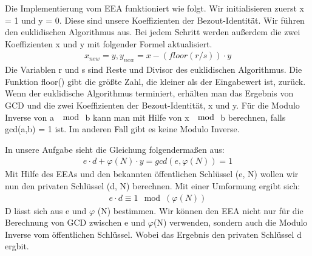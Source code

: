 \documentclass[course=asp]{aspdoc}
\begin{document}
Die Implementierung vom EEA funktioniert wie folgt. Wir initialisieren zuerst x = 1 und y = 0. Diese sind unsere Koeffizienten der Bezout-Identität. Wir führen den euklidischen Algorithmus aus. Bei jedem Schritt werden außerdem die zwei Koeffizienten x und y mit folgender Formel aktualisiert. 
\begin{align}
	x_{new} = y, y_{new} = x - (floor(r/s)) \cdot y
\end{align} 
Die Variablen r und s sind Reste und Divisor des euklidischen Algorithmus. Die Funktion floor() gibt die größte Zahl, die kleiner als der Eingabewert ist, zurück. 
Wenn der euklidische Algorithmus terminiert, erhälten man das Ergebnis von GCD und die zwei Koeffizienten der Bezout-Identität, x und y.\cite{ExtendedEuclideanAlgorithm} Für die Modulo Inverse von a $\mod$ b kann man mit Hilfe von x $\mod$ b berechnen, falls gcd(a,b) = 1 ist. Im anderen Fall gibt es keine Modulo Inverse.
 
In unsere Aufgabe sieht die Gleichung folgendermaßen aus:
\begin{align}
	e\cdot d + \varphi (N)\cdot y = gcd(e, \varphi(N)) = 1
\end{align}
Mit Hilfe des EEAs und den bekannten öffentlichen Schlüssel (e, N) wollen wir nun den privaten Schlüssel (d, N) berechnen. Mit einer Umformung ergibt sich: 
\begin{align}	
	e\cdot d \equiv 1 \mod (\varphi(N))
\end{align}
D lässt sich aus e und $\varphi $ (N) bestimmen. Wir können den EEA nicht nur für die Berechnung von GCD zwischen e und $\varphi $(N) verwenden, sondern auch die Modulo Inverse vom öffentlichen Schlüssel. Wobei das Ergebnis den privaten Schlüssel d ergbit.
\end{document}
